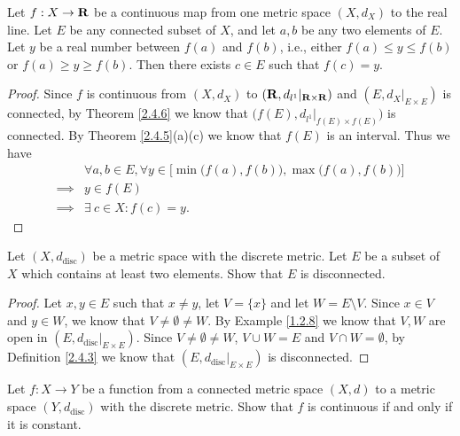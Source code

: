 \begin{corollary}\label{2.4.7}
    Let \(f : X \to \mathbf{R}\) be a continuous map from one metric space \((X, d_X)\) to the real line.
    Let \(E\) be any connected subset of \(X\), and let \(a, b\) be any two elements of \(E\).
    Let \(y\) be a real number between \(f(a)\) and \(f(b)\), i.e., either \(f(a) \leq y \leq f(b)\) or \(f(a) \geq y \geq f(b)\).
    Then there exists \(c \in E\) such that \(f(c) = y\).
\end{corollary}

\begin{proof}
    Since \(f\) is continuous from \((X, d_X)\) to \((\mathbf{R}, d_{l^1}|_{\mathbf{R} \times \mathbf{R}})\) and \((E, d_X|_{E \times E})\) is connected, by Theorem \ref{2.4.6} we know that \(\big(f(E), d_{l^1}|_{f(E) \times f(E)}\big)\) is connected.
    By Theorem \ref{2.4.5}(a)(c) we know that \(f(E)\) is an interval.
    Thus we have
    \begin{align*}
                 & \forall a, b \in E, \forall y \in \Big[\min\big(f(a), f(b)\big), \max\big(f(a), f(b)\big)\Big] \\
        \implies & y \in f(E)                                                                                     \\
        \implies & \exists\ c \in X : f(c) = y.
    \end{align*}
\end{proof}

\exercisesection

\begin{exercise}\label{ex 2.4.1}
    Let \((X, d_{\text{disc}})\) be a metric space with the discrete metric.
    Let \(E\) be a subset of \(X\) which contains at least two elements.
    Show that \(E\) is disconnected.
\end{exercise}

\begin{proof}
    Let \(x, y \in E\) such that \(x \neq y\), let \(V = \{x\}\) and let \(W = E \setminus V\).
    Since \(x \in V\) and \(y \in W\), we know that \(V \neq \emptyset \neq W\).
    By Example \ref{1.2.8} we know that \(V, W\) are open in \((E, d_{\text{disc}}|_{E \times E})\).
    Since \(V \neq \emptyset \neq W\), \(V \cup W = E\) and \(V \cap W = \emptyset\), by Definition \ref{2.4.3} we know that \((E, d_{\text{disc}}|_{E \times E})\) is disconnected.
\end{proof}

\begin{exercise}\label{ex 2.4.2}
    Let \(f : X \to Y\) be a function from a connected metric space \((X, d)\) to a metric space \((Y, d_{\text{disc}})\) with the discrete metric.
    Show that \(f\) is continuous if and only if it is constant.
\end{exercise}

